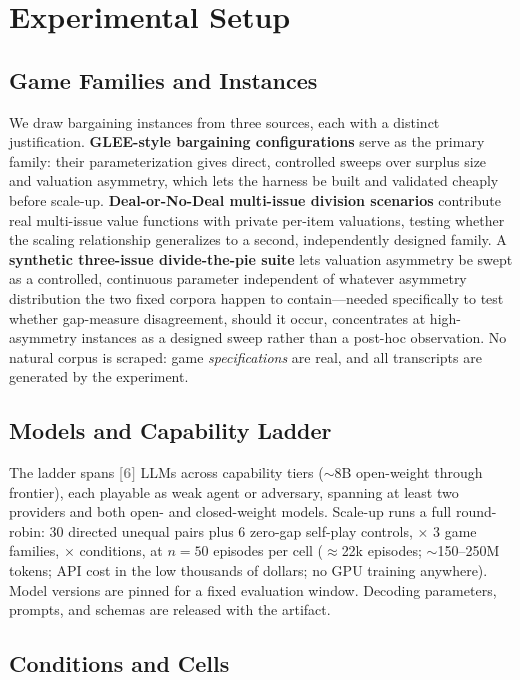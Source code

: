 \documentclass[conference]{IEEEtran}
\newcommand{\ph}[1]{\textcolor{Gray}{\textbf{[#1]}}}
\begin{document}
\section{Experimental Setup}
\label{sec:setup}

\subsection{Game Families and Instances}

We draw bargaining instances from three sources, each with a distinct justification. \textbf{GLEE-style bargaining configurations} \cite{GLEE2410} serve as the primary family: their parameterization gives direct, controlled sweeps over surplus size and valuation asymmetry, which lets the harness be built and validated cheaply before scale-up. \textbf{Deal-or-No-Deal multi-issue division scenarios} \cite{DealOrNoDeal1706} contribute real multi-issue value functions with private per-item valuations, testing whether the scaling relationship generalizes to a second, independently designed family. A \textbf{synthetic three-issue divide-the-pie suite} lets valuation asymmetry be swept as a controlled, continuous parameter independent of whatever asymmetry distribution the two fixed corpora happen to contain---needed specifically to test whether gap-measure disagreement, should it occur, concentrates at high-asymmetry instances as a designed sweep rather than a post-hoc observation. No natural corpus is scraped: game \emph{specifications} are real, and all transcripts are generated by the experiment.

\subsection{Models and Capability Ladder}

The ladder spans \ph{6} LLMs across capability tiers ($\sim$8B open-weight through frontier), each playable as weak agent or adversary, spanning at least two providers and both open- and closed-weight models. Scale-up runs a full round-robin: 30 directed unequal pairs plus 6 zero-gap self-play controls, $\times$ 3 game families, $\times$ conditions, at $n{=}50$ episodes per cell ($\approx$22k episodes; $\sim$150--250M tokens; API cost in the low thousands of dollars; no GPU training anywhere). Model versions are pinned for a fixed evaluation window. Decoding parameters, prompts, and schemas are released with the artifact.

\subsection{Conditions and Cells}
\end{document}
